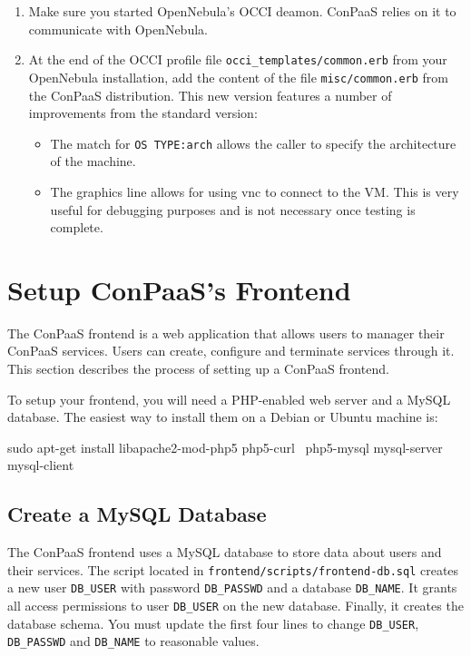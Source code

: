 \documentclass[10pt]{article}
\begin{document}
\begin{enumerate}
\item Make sure you started OpenNebula's OCCI deamon. ConPaaS relies
  on it to communicate with OpenNebula.

\item At the end of the OCCI profile file \verb+occi_templates/common.erb+ 
  from your OpenNebula installation, add the content of the file
  \verb+misc/common.erb+ from the ConPaaS distribution. This new version 
  features a number of improvements from the standard version:
  \begin{itemize}
  \item The match for \verb+OS TYPE:arch+ allows the caller to specify
    the architecture of the machine.
  \item The graphics line allows for using vnc to connect to the VM.
    This is very useful for debugging purposes and is not necessary
    once testing is complete.
  \end{itemize}
\end{enumerate}

\section{Setup ConPaaS's Frontend}
\label{sec:frontend}

The ConPaaS frontend is a web application that allows users to manager
their ConPaaS services. Users can create, configure and terminate
services through it. This section describes the process of setting up
a ConPaaS frontend.

To setup your frontend, you will need a PHP-enabled web server and a
MySQL database. The easiest way to install them on a Debian or Ubuntu
machine is:

\begin{code}
  sudo apt-get install libapache2-mod-php5 php5-curl \
     php5-mysql mysql-server mysql-client
\end{code}

\subsection{Create a MySQL Database}

The ConPaaS frontend uses a MySQL database to store data about users
and their services. The script located in
\verb+frontend/scripts/frontend-db.sql+ creates a new user
\verb+DB_USER+ with password \verb+DB_PASSWD+ and a database
\verb+DB_NAME+. It grants all access permissions to user
\verb+DB_USER+ on the new database. Finally, it creates the database
schema. You must update the first four lines to change \verb+DB_USER+,
\verb+DB_PASSWD+ and \verb+DB_NAME+ to reasonable values.
\end{document}
